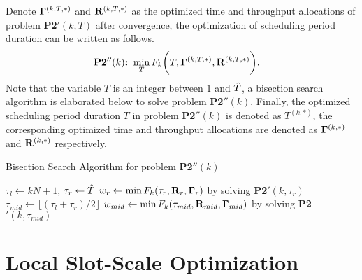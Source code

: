 Denote ${\mathbf{\Gamma}^{(k,T,*)}}$ and ${\mathbf{R}^{(k,T,*)}}$ as the optimized time and throughput allocations of problem \textbf{P2$'(k,T)$} after convergence, the optimization of scheduling period duration can be written as follows.
\begin{align}
    \textbf{P2$''(k)$:~} & \min_{T} F_{k}  \bigg(T, {\mathbf{\Gamma}^{(k,T,*)}}, {\mathbf{R}^{(k,T,*)}} \bigg).
    \label{eqn:p2pp_k}
\end{align}
Note that the variable $T$ is an integer between $1$ and ${\hat{T}}$, a  bisection search algorithm is elaborated below to solve problem \textbf{P2$''(k)$}. Finally, the optimized scheduling period duration $T$ in problem \textbf{P2$''(k)$} is denoted as $T^{(k,*)}$, the corresponding optimized time and throughput allocations are denoted as $\mathbf{\Gamma}^{(k,*)}$ and  ${\mathbf{R}^{(k,*)}}$ respectively. 
\begin{algorithm}[ht]
    \caption{Bisection Search Algorithm for problem \textbf{P2$''(k)$}}\label{alg_bnb}
    \DontPrintSemicolon
    $\tau_{l} \gets kN+1$, $\tau_{r} \gets {\hat{T}}$\;
     $w_{r} \gets \min F_{k}( \tau_{r}, \mathbf{R}_{r}, \mathbf{\Gamma}_{r} )$ by solving \textbf{P2$'( k,\tau_{r} )$}\;
    {
        $\tau_{mid} \gets \lfloor{ (\tau_{l} + \tau_{r})/2 }\rfloor$\;
        $w_{mid} \gets \min F_{k}( \tau_{mid}, \mathbf{R}_{mid}, \mathbf{\Gamma}_{mid} )$ by solving \textbf{P2$'( k,\tau_{mid} )$}\;
    }
    \;
\end{algorithm}

\section{Local Slot-Scale Optimization}
\label{sec:chapter2-local-policy}

